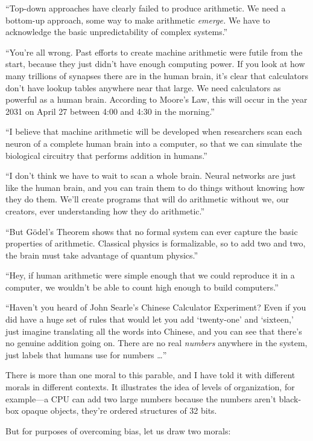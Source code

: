 {
 ``Top-down approaches have clearly failed to
produce arithmetic. We need a bottom-up approach, some way to make
arithmetic \textit{emerge.} We have to acknowledge the basic
unpredictability of complex systems.''}

{
 ``You're all wrong. Past efforts
to create machine arithmetic were futile from the start, because they
just didn't have enough computing power. If you look at
how many trillions of synapses there are in the human brain,
it's clear that calculators don't have
lookup tables anywhere near that large. We need calculators as powerful
as a human brain. According to Moore's Law, this will
occur in the year 2031 on April 27 between 4:00 and 4:30 in the
morning.''}

{
 ``I believe that machine arithmetic will be
developed when researchers scan each neuron of a complete human brain
into a computer, so that we can simulate the biological circuitry that
performs addition in humans.''}

{
 ``I don't think we have to wait
to scan a whole brain. Neural networks are just like the human brain,
and you can train them to do things without knowing how they do them.
We'll create programs that will do arithmetic without
we, our creators, ever understanding how they do
arithmetic.''}

{
 ``But Gödel's Theorem shows that
no formal system can ever capture the basic properties of arithmetic.
Classical physics is formalizable, so to add two and two, the brain
must take advantage of quantum physics.''}

{
 ``Hey, if human arithmetic were simple enough
that we could reproduce it in a computer, we wouldn't
be able to count high enough to build computers.''}

{
 ``Haven't you heard of John
Searle's Chinese Calculator Experiment? Even if you did
have a huge set of rules that would let you add
`twenty-one' and
`sixteen,' just imagine translating all
the words into Chinese, and you can see that there's no
genuine addition going on. There are no real \textit{numbers} anywhere
in the system, just labels that humans use for numbers
\ldots''}

{
 There is more than one moral to this parable, and I have told it
with different morals in different contexts. It illustrates the idea of
levels of organization, for example---a CPU can add two large numbers
because the numbers aren't black-box opaque objects,
they're ordered structures of 32 bits.}

{
 But for purposes of overcoming bias, let us draw two morals:}

